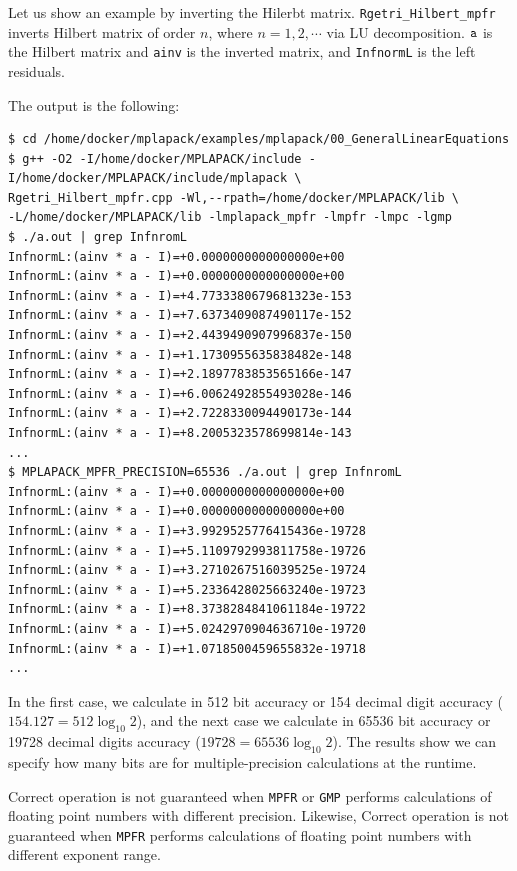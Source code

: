 \documentclass[12pt]{article}
\begin{document}
Let us show an example by inverting the Hilerbt matrix.
{\tt Rgetri\_Hilbert\_mpfr} inverts Hilbert matrix of order $n$, where $n=1, 2, \cdots $ via LU decomposition.
${\tt a}$ is the Hilbert matrix and {\tt ainv} is the inverted matrix, and {\tt InfnormL} is the left residuals.

The output is the following:
\begin{verbatim}
$ cd /home/docker/mplapack/examples/mplapack/00_GeneralLinearEquations
$ g++ -O2 -I/home/docker/MPLAPACK/include -I/home/docker/MPLAPACK/include/mplapack \
Rgetri_Hilbert_mpfr.cpp -Wl,--rpath=/home/docker/MPLAPACK/lib \
-L/home/docker/MPLAPACK/lib -lmplapack_mpfr -lmpfr -lmpc -lgmp
$ ./a.out | grep InfnromL
InfnormL:(ainv * a - I)=+0.0000000000000000e+00
InfnormL:(ainv * a - I)=+0.0000000000000000e+00
InfnormL:(ainv * a - I)=+4.7733380679681323e-153
InfnormL:(ainv * a - I)=+7.6373409087490117e-152
InfnormL:(ainv * a - I)=+2.4439490907996837e-150
InfnormL:(ainv * a - I)=+1.1730955635838482e-148
InfnormL:(ainv * a - I)=+2.1897783853565166e-147
InfnormL:(ainv * a - I)=+6.0062492855493028e-146
InfnormL:(ainv * a - I)=+2.7228330094490173e-144
InfnormL:(ainv * a - I)=+8.2005323578699814e-143
...
$ MPLAPACK_MPFR_PRECISION=65536 ./a.out | grep InfnromL
InfnormL:(ainv * a - I)=+0.0000000000000000e+00
InfnormL:(ainv * a - I)=+0.0000000000000000e+00
InfnormL:(ainv * a - I)=+3.9929525776415436e-19728
InfnormL:(ainv * a - I)=+5.1109792993811758e-19726
InfnormL:(ainv * a - I)=+3.2710267516039525e-19724
InfnormL:(ainv * a - I)=+5.2336428025663240e-19723
InfnormL:(ainv * a - I)=+8.3738284841061184e-19722
InfnormL:(ainv * a - I)=+5.0242970904636710e-19720
InfnormL:(ainv * a - I)=+1.0718500459655832e-19718
...
\end{verbatim}
In the first case, we calculate in 512 bit accuracy or 154 decimal digit accuracy ($154.127 =512 \log_{10}2$), and the next case we calculate in 65536 bit accuracy or 19728 decimal digits accuracy ($19728 = 65536 \log_{10}2$). The results show we can specify how many bits are for multiple-precision calculations at the runtime.

Correct operation is not guaranteed when {\tt MPFR} or {\tt GMP} performs calculations of floating point numbers with different precision. Likewise, Correct operation is not guaranteed when {\tt MPFR}  performs calculations of floating point numbers with different exponent range.
\end{document}

